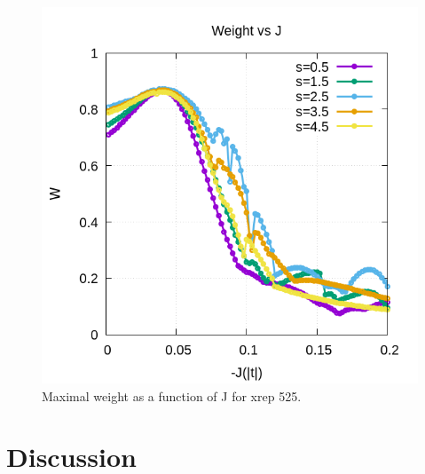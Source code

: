 \documentclass[ openright,titlepage,numbers=noenddot,headinclude,twoside,%
                footinclude=true,cleardoublepage=empty,abstractoff,%
                BCOR=5mm,paper=a4,fontsize=11pt,%
                ngerman,american,%
]{scrreprt}
\begin{document}
\begin{figure}[ht]
    \centering
    \includegraphics[scale=0.5]{Wmax_vs_J_xrep525.png}
    \caption{\label{fig:}Maximal weight as a function of J for xrep 525. }
\end{figure}

\section{Discussion}
\end{document}
